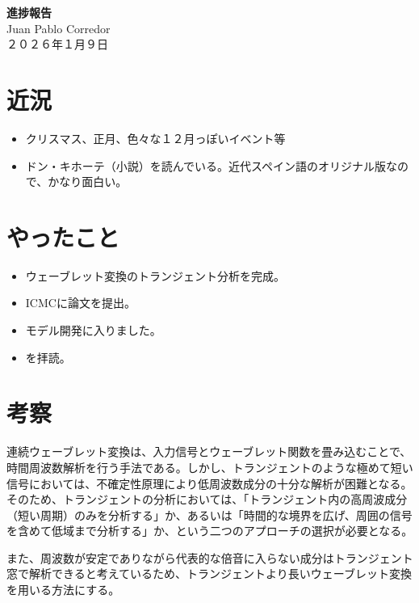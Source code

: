 \documentclass[a4paper, 11pt]{article}
\begin{document}
\begin{center}
    {\LARGE \bfseries 進捗報告} \\ %
    \vspace{0.3em} %
    Juan Pablo Corredor \\ %
    ２０２６年１月９日 %
\end{center}
\vspace{0.5em} %

\section*{近況}
\begin{itemize}
    \item クリスマス、正月、色々な１２月っぽいイベント等
    \item ドン・キホーテ（小説）を読んでいる。近代スペイン語のオリジナル版なので、かなり面白い。
\end{itemize}

\section*{やったこと}
\begin{itemize} 
    \item ウェーブレット変換のトランジェント分析を完成。
    \item ICMCに論文を提出。
    \item モデル開発に入りました。
    \item \cite{soundMorphingCaetano}を拝読。
\end{itemize}

\section*{考察}

連続ウェーブレット変換は、入力信号とウェーブレット関数を畳み込むことで、時間周波数解析を行う手法である。しかし、トランジェントのような極めて短い信号においては、不確定性原理により低周波数成分の十分な解析が困難となる。 そのため、トランジェントの分析においては、「トランジェント内の高周波成分（短い周期）のみを分析する」か、あるいは「時間的な境界を広げ、周囲の信号を含めて低域まで分析する」か、という二つのアプローチの選択が必要となる。

また、周波数が安定でありながら代表的な倍音に入らない成分はトランジェント窓で解析できると考えているため、トランジェントより長いウェーブレット変換を用いる方法にする。
\end{document}
